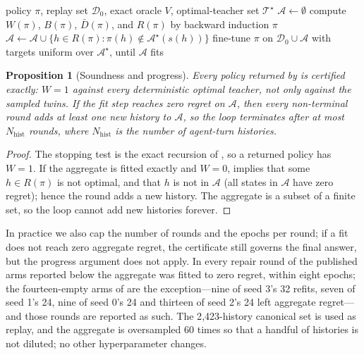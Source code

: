 \documentclass[conference]{IEEEtran}
\newtheorem{proposition}{Proposition}
\begin{document}
\begin{algorithm}[t]
\caption{Certificate-Guided Repair (CGR)}
\label{alg:cgr}
\begin{algorithmic}[1]
\REQUIRE policy $\pi$, replay set $\mathcal{D}_0$, exact oracle $V$, optimal-teacher set $\mathcal{T}^{\star}$
\STATE $\mathcal{A}\gets\emptyset$
  \STATE compute $W(\pi)$, $B(\pi)$, $\bar D(\pi)$, and $R(\pi)$ by backward induction
    \RETURN $\pi$ 
  \ENDIF
  \STATE $\mathcal{A}\gets\mathcal{A}\cup\{h\in R(\pi):\pi(h)\notin\mathcal{A}^{\star}(s(h))\}$
  \STATE fine-tune $\pi$ on $\mathcal{D}_0\cup\mathcal{A}$ with targets uniform over $\mathcal{A}^{\star}$, until $\mathcal{A}$ fits
\ENDFOR
\end{algorithmic}
\end{algorithm}

\begin{proposition}[Soundness and progress]
\label{prop:cgr}
Every policy returned by  is certified exactly: $W=1$ against every deterministic optimal teacher, not only against the sampled twins. If the fit step reaches zero regret on $\mathcal{A}$, then every non-terminal round adds at least one new history to $\mathcal{A}$, so the loop terminates after at most $N_{\text{hist}}$ rounds, where $N_{\text{hist}}$ is the number of agent-turn histories.
\end{proposition}

\begin{proof}
The stopping test is the exact recursion of , so a returned policy has $W=1$. If the aggregate is fitted exactly and $W=0$,  implies that some $h\in R(\pi)$ is not optimal, and that $h$ is not in $\mathcal{A}$ (all states in $\mathcal{A}$ have zero regret); hence the round adds a new history. The aggregate is a subset of a finite set, so the loop cannot add new histories forever.
\end{proof}

In practice we also cap the number of rounds and the epochs per round; if a fit does not reach zero aggregate regret, the certificate still governs the final answer, but the progress argument does not apply. In every repair round of the published arms reported below the aggregate was fitted to zero regret, within eight epochs; the fourteen-empty arms of  are the exception---nine of seed 3's 32 refits, seven of seed 1's 24, nine of seed 0's 24 and thirteen of seed 2's 24 left aggregate regret---and those rounds are reported as such. The 2{,}423-history canonical set is used as replay, and the aggregate is oversampled 60 times so that a handful of histories is not diluted; no other hyperparameter changes.
\end{document}
